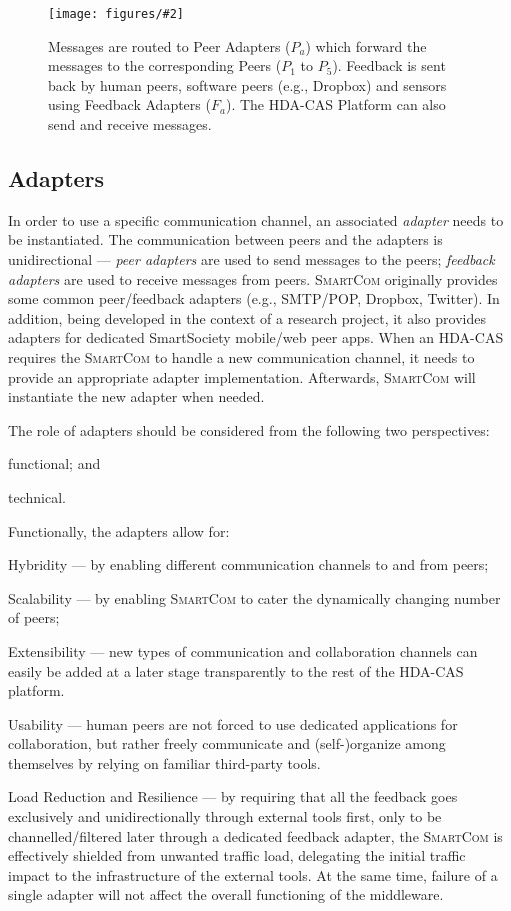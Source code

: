 \documentclass{llncs}
\newcommand{\mdl}{\textsc{SmartCom}}
\newcommand{\figcol}[3][0.9]{
\begin{figure}[H] %
\centering
\texttt{[image: figures/\#2]}
\caption{#3}
\label{fig:#2}
\end{figure}
}
\begin{document}
    \figcol[.75]{routes}{Messages are routed to Peer Adapters ($P_a$) which forward the messages to the corresponding Peers ($P_1$ to $P_5$). Feedback is sent back by human peers, software peers (e.g., Dropbox) and sensors using Feedback Adapters ($F_a$). The HDA-CAS Platform can also send and receive messages.}

  \subsection{Adapters}
  \label{sec:adapters}

    In order to use a specific communication channel, an associated \emph{adapter} needs to be instantiated. The communication between peers and the adapters is unidirectional --- \emph{peer adapters} are used to send messages to the peers; \emph{feedback adapters} are used to receive messages from peers. 
    \mdl{} originally provides some common peer/feedback adapters  (e.g., SMTP/POP, Dropbox, Twitter). In addition, being developed in the context of a research project, it also provides adapters for dedicated SmartSociety mobile/web peer apps. When an HDA-CAS requires the \mdl{} to handle a new communication channel, it needs to provide an appropriate adapter implementation. Afterwards, \mdl{} will instantiate the new adapter when needed.

    The role of adapters should be considered from the following two perspectives:
    \begin{inparaenum}[\itshape i)]
    \item functional; and 
    \item technical.
    \end{inparaenum}

    Functionally, the adapters allow for:
    \begin{inparaenum}[\itshape a)]
    \item Hybridity --- by enabling different communication channels to and from peers;
    \item Scalability --- by enabling \mdl{} to cater the dynamically changing number of peers;
    \item Extensibility --- new types of communication and collaboration channels can easily be added at a later stage transparently to the rest of the HDA-CAS platform.
    \item Usability --- human peers are not forced to use dedicated applications for collaboration, but rather freely communicate and (self-)organize among themselves by relying on familiar third-party tools.
    \item Load Reduction and Resilience --- by requiring that all the feedback goes exclusively and unidirectionally through external tools first, only to be channelled/filtered later through a dedicated feedback adapter, the \mdl{} is effectively shielded from unwanted traffic load, delegating the initial traffic impact to the infrastructure of the external tools. At the same time, failure of a single adapter will not affect the overall functioning of the middleware.
    \end{inparaenum}
\end{document}
